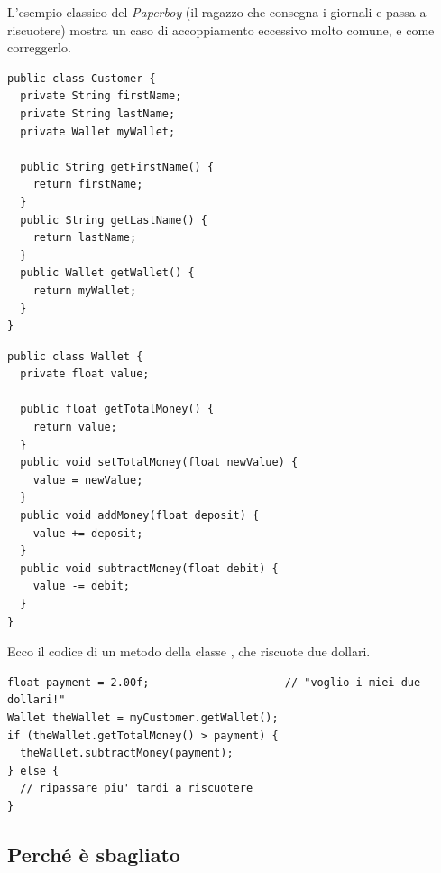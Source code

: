 L'esempio classico del \textit{Paperboy} (il ragazzo che consegna i giornali e passa a riscuotere) mostra un caso di
accoppiamento eccessivo molto comune, e come correggerlo.

\noindent\begin{minipage}[t]{0.49\textwidth}
\begin{lstlisting}[style=java]
public class Customer {
  private String firstName;
  private String lastName;
  private Wallet myWallet;

  public String getFirstName() {
    return firstName;
  }
  public String getLastName() {
    return lastName;
  }
  public Wallet getWallet() {
    return myWallet;
  }
}
\end{lstlisting}
\end{minipage}\hfill
\begin{minipage}[t]{0.49\textwidth}
\begin{lstlisting}[style=java]
public class Wallet {
  private float value;

  public float getTotalMoney() {
    return value;
  }
  public void setTotalMoney(float newValue) {
    value = newValue;
  }
  public void addMoney(float deposit) {
    value += deposit;
  }
  public void subtractMoney(float debit) {
    value -= debit;
  }
}
\end{lstlisting}
\end{minipage}

Ecco il codice di un metodo della classe , che riscuote due dollari.

\begin{lstlisting}[style=java]
float payment = 2.00f;                     // "voglio i miei due dollari!"
Wallet theWallet = myCustomer.getWallet();
if (theWallet.getTotalMoney() > payment) {
  theWallet.subtractMoney(payment);
} else {
  // ripassare piu' tardi a riscuotere
}
\end{lstlisting}

\subsection{Perché è sbagliato}

